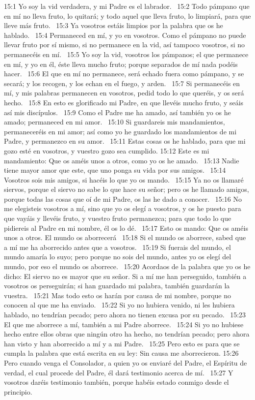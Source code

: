 15:1 Yo soy la vid verdadera, y mi Padre es el labrador.  
15:2 Todo pámpano que en mí no lleva fruto, lo quitará; y todo aquel que lleva fruto, lo limpiará, para que lleve más fruto.  
15:3 Ya vosotros estáis limpios por la palabra que os he hablado.  
15:4 Permaneced en mí, y yo en vosotros. Como el pámpano no puede llevar fruto por sí mismo, si no permanece en la vid, así tampoco vosotros, si no permanecéis en mí.  
15:5 Yo soy la vid, vosotros los pámpanos; el que permanece en mí, y yo en él, éste lleva mucho fruto; porque separados de mí nada podéis hacer.  
15:6 El que en mí no permanece, será echado fuera como pámpano, y se secará; y los recogen, y los echan en el fuego, y arden.  
15:7 Si permanecéis en mí, y mis palabras permanecen en vosotros, pedid todo lo que queréis, y os será hecho.  
15:8 En esto es glorificado mi Padre, en que llevéis mucho fruto, y seáis así mis discípulos.  
15:9 Como el Padre me ha amado, así también yo os he amado; permaneced en mi amor.  
15:10 Si guardareis mis mandamientos, permaneceréis en mi amor; así como yo he guardado los mandamientos de mi Padre, y permanezco en su amor.  
15:11 Estas cosas os he hablado, para que mi gozo esté en vosotros, y vuestro gozo sea cumplido. 
15:12 Este es mi mandamiento: Que os améis unos a otros, como yo os he amado.  
15:13 Nadie tiene mayor amor que este, que uno ponga su vida por sus amigos.  
15:14 Vosotros sois mis amigos, si hacéis lo que yo os mando.  
15:15 Ya no os llamaré siervos, porque el siervo no sabe lo que hace su señor; pero os he llamado amigos, porque todas las cosas que oí de mi Padre, os las he dado a conocer.  
15:16 No me elegisteis vosotros a mí, sino que yo os elegí a vosotros, y os he puesto para que vayáis y llevéis fruto, y vuestro fruto permanezca; para que todo lo que pidiereis al Padre en mi nombre, él os lo dé.  
15:17 Esto os mando: Que os améis unos a otros. 
El mundo os aborrecerá  
15:18 Si el mundo os aborrece, sabed que a mí me ha aborrecido antes que a vosotros.  
15:19 Si fuerais del mundo, el mundo amaría lo suyo; pero porque no sois del mundo, antes yo os elegí del mundo, por eso el mundo os aborrece.  
15:20 Acordaos de la palabra que yo os he dicho: El siervo no es mayor que su señor. Si a mí me han perseguido, también a vosotros os perseguirán; si han guardado mi palabra, también guardarán la vuestra.  
15:21 Mas todo esto os harán por causa de mi nombre, porque no conocen al que me ha enviado.  
15:22 Si yo no hubiera venido, ni les hubiera hablado, no tendrían pecado; pero ahora no tienen excusa por su pecado.  
15:23 El que me aborrece a mí, también a mi Padre aborrece.  
15:24 Si yo no hubiese hecho entre ellos obras que ningún otro ha hecho, no tendrían pecado; pero ahora han visto y han aborrecido a mí y a mi Padre.  
15:25 Pero esto es para que se cumpla la palabra que está escrita en su ley: Sin causa me aborrecieron. 
15:26 Pero cuando venga el Consolador, a quien yo os enviaré del Padre, el Espíritu de verdad, el cual procede del Padre, él dará testimonio acerca de mí.  
15:27 Y vosotros daréis testimonio también, porque habéis estado conmigo desde el principio. 
